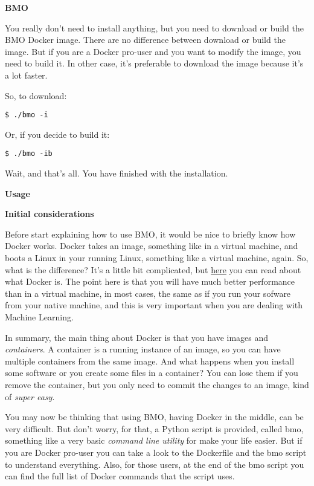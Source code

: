 \large
\textbf{BMO}

\normalsize
You really don't need to install anything, but you need to download or build the BMO Docker image. There are no difference between download or build the image. But if you are a Docker pro-user and you want to modify the image, you need to build it. In other case, it's preferable to download the image because it's a lot faster.

So, to download:

\vspace*{3mm}
\begin{lstlisting}
$ ./bmo -i
\end{lstlisting}

Or, if you decide to build it:

\vspace*{3mm}
\begin{lstlisting}
$ ./bmo -ib
\end{lstlisting}

Wait, and that's all. You have finished with the installation.

\Large
\textbf{Usage}

\large
\textbf{Initial considerations}

\normalsize
Before start explaining how to use BMO, it would be nice to briefly know how Docker works. Docker takes an image, something like in a virtual machine, and boots a Linux in your running Linux, something like a virtual machine, again. So, what is the difference? It's a little bit complicated, but \href{https://docs.docker.com/introduction/understanding-docker/}{here} you can read about what Docker is. The point here is that you will have much better performance than in a virtual machine, in most cases, the same as if you run your sofware from your native machine, and this is very important when you are dealing with Machine Learning.

In summary, the main thing about Docker is that you have images and \emph{containers}. A container is a running instance of an image, so you can have multiple containers from the same image. And what happens when you install some software or you create some files in a container? You can lose them if you remove the container, but you only need to commit the changes to an image, kind of \emph{super easy}.

You may now be thinking that using BMO, having Docker in the middle, can be very difficult. But don't worry, for that, a Python script is provided, called bmo, something like a very basic \emph{command line utility} for make your life easier. But if you are Docker pro-user you can take a look to the Dockerfile and the bmo script to understand everything. Also, for those users, at the end of the bmo script you can find the full list of Docker commands that the script uses.

